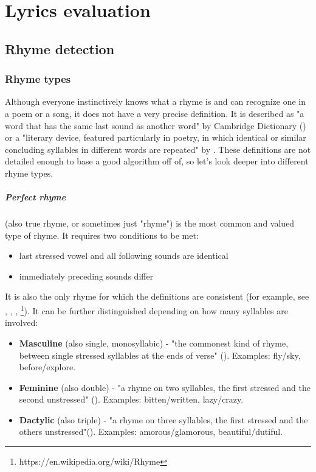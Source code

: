 \chapter{Lyrics evaluation}

\section{Rhyme detection}
\subsection{Rhyme types}
Although everyone instinctively knows what a rhyme is and can recognize one in a poem or a song, it does not have a very precise definition. It is described as "a word that has the same last sound as another word" by Cambridge Dictionary (\cite{walter2008cambridge}) or a "literary device, featured particularly in poetry, in which identical or similar concluding syllables in different words are repeated" by \cite{literarydevices2020}. These definitions are not detailed enough to base a good algorithm off of, so let's look deeper into different rhyme types.

\paragraph{Perfect rhyme} (also true rhyme, or sometimes just "rhyme") is the most common and valued  type of rhyme. It requires two conditions to be met:

\begin{itemize}
	\item last stressed vowel and all following sounds are identical
	\item immediately preceding sounds differ
\end{itemize}

It is also the only rhyme for which the definitions are consistent (for example, see \cite{bain1867manual}, \cite{vanphonological}, \cite{bergman2017litcharts}, \footnote{https://en.wikipedia.org/wiki/Rhyme}). It can be further distinguished depending on how many syllables are involved:

\begin{itemize}
	\item \textbf{Masculine} (also single, monosyllabic) - "the commonest kind of rhyme, between single stressed syllables at the ends of verse" (\cite{oxforddict2008literary}). Examples: fly/sky, before/explore.
	\item \textbf{Feminine} (also double) - "a rhyme on two syllables, the first stressed and the second unstressed" (\cite{oxforddict2008literary}). Examples: bitten/written, lazy/crazy. 
	\item \textbf{Dactylic} (also triple) - "a rhyme on three syllables, the first stressed and the others unstressed"(\cite{oxforddict2008literary}). Examples: amorous/glamorous, beautiful/dutiful.
\end{itemize}

